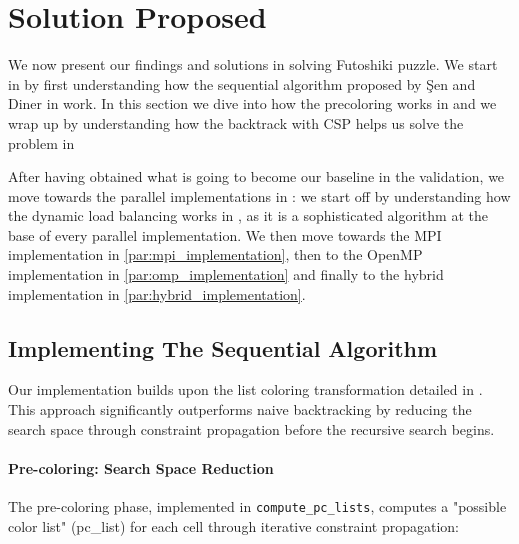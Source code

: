 \section{Solution Proposed}
\label{sec:solution}

We now present our findings and solutions in solving Futoshiki puzzle. We start in  by first understanding how the sequential algorithm proposed by Şen and Diner in \cite{Sen2024Futoshiki} work. In this section we dive into how the precoloring works in  and we wrap up by understanding how the backtrack with CSP helps us solve the problem in 

After having obtained what is going to become our baseline in the validation, we move towards the parallel implementations in : we start off by understanding how the dynamic load balancing works in , as it is a sophisticated algorithm at the base of every parallel implementation. We then move towards the MPI implementation in \cref{par:mpi_implementation}, then to the OpenMP implementation in \cref{par:omp_implementation} and finally to the hybrid implementation in \cref{par:hybrid_implementation}.

\subsection{Implementing The Sequential Algorithm}
\label{subsec:paper_implementation}
Our implementation builds upon the list coloring transformation detailed in \cite{Sen2024Futoshiki}. This approach significantly outperforms naive backtracking by reducing the search space through constraint propagation before the recursive search begins.

\paragraph{Pre-coloring: Search Space Reduction}
\label{par:precoloring}
The pre-coloring phase, implemented in \texttt{compute\_pc\_lists}, computes a "possible color list" (pc\_list) for each cell through iterative constraint propagation:

